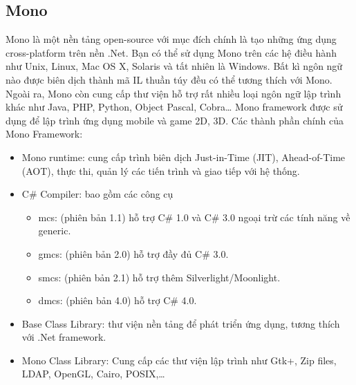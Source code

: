 \subsection{Mono}
Mono là một nền tảng open-source với mục đích chính là tạo những ứng dụng cross-platform trên nền .Net. Bạn có thể sử dụng Mono trên các hệ điều hành như Unix, Linux, Mac OS X, Solaris và tất nhiên là Windows. Bất kì ngôn ngữ nào được biên dịch thành mã IL thuần túy đều có thể tương thích với Mono. Ngoài ra, Mono còn cung cấp thư viện hỗ trợ rất nhiều loại ngôn ngữ lập trình khác như Java, PHP, Python, Object Pascal, Cobra… Mono framework được sử dụng để lập trình ứng dụng mobile và game 2D, 3D. Các thành phần chính của Mono Framework:
\begin{itemize}
\item Mono runtime: cung cấp trình biên dịch Just-in-Time (JIT), Ahead-of-Time (AOT), thực thi, quản lý các tiến trình và giao tiếp với hệ thống.
\item C\# Compiler: bao gồm các công cụ
\begin{itemize}
\item mcs: (phiên bản 1.1) hỗ trợ C\# 1.0 và C\# 3.0 ngoại trừ các tính năng về generic.
\item gmcs: (phiên bản 2.0) hỗ trợ đầy đủ C\# 3.0.
\item smcs: (phiên bản 2.1) hỗ trợ thêm Silverlight/Moonlight.
\item dmcs: (phiên bản 4.0) hỗ trợ C\# 4.0.
\end{itemize}
\item Base Class Library: thư viện nền tảng để phát triển ứng dụng, tương thích với .Net framework.
\item Mono Class Library: Cung cấp các thư viện lập trình như Gtk+, Zip files, LDAP, OpenGL, Cairo, POSIX,… \cite{4}
\end{itemize}
